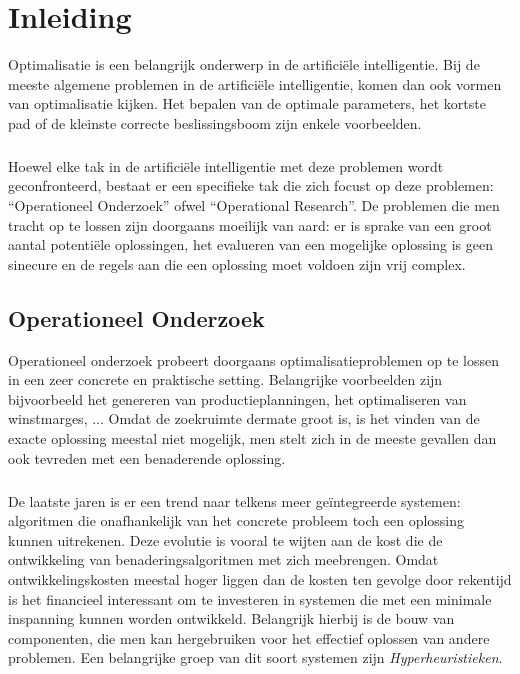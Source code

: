 \chapter{Inleiding}

Optimalisatie is een belangrijk onderwerp in de artifici\"ele intelligentie. Bij de meeste algemene problemen in de artifici\"ele intelligentie, komen dan ook vormen van optimalisatie kijken. Het bepalen van de optimale parameters, het kortste pad of de kleinste correcte beslissingsboom zijn enkele voorbeelden.

\paragraph{}
Hoewel elke tak in de artifici\"ele intelligentie met deze problemen wordt geconfronteerd, bestaat er een specifieke tak die zich focust op deze problemen: ``Operationeel Onderzoek'' ofwel ``Operational Research''. De problemen die men tracht op te lossen zijn doorgaans moeilijk van aard: er is sprake van een groot aantal potenti\"ele oplossingen, het evalueren van een mogelijke oplossing is geen sinecure en de regels aan die een oplossing moet voldoen zijn vrij complex.

\section{Operationeel Onderzoek}

Operationeel onderzoek probeert doorgaans optimalisatieproblemen op te lossen in een zeer concrete en praktische setting. Belangrijke voorbeelden zijn bijvoorbeeld het genereren van productieplanningen, het optimaliseren van winstmarges, ... Omdat de zoekruimte dermate groot is, is het vinden van de exacte oplossing meestal niet mogelijk, men stelt zich in de meeste gevallen dan ook tevreden met een benaderende oplossing.

\paragraph{}
De laatste jaren is er een trend naar telkens meer ge\"integreerde systemen: algoritmen die onafhankelijk van het concrete probleem toch een oplossing kunnen uitrekenen. Deze evolutie is vooral te wijten aan de kost die de ontwikkeling van benaderingsalgoritmen met zich meebrengen. Omdat ontwikkelingskosten meestal hoger liggen dan de kosten ten gevolge door rekentijd is het financieel interessant om te investeren in systemen die met een minimale inspanning kunnen worden ontwikkeld. Belangrijk hierbij is de bouw van componenten, die men kan hergebruiken voor het effectief oplossen van andere problemen. Een belangrijke groep van dit soort systemen zijn \emph{Hyperheuristieken}.

